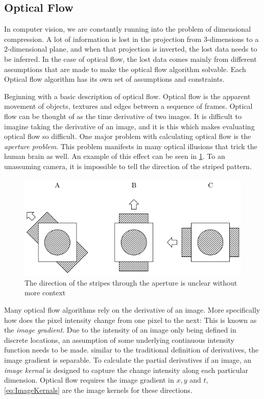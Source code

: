 \documentclass{UoNMCHA}
\numberwithin{equation}{section}
\begin{document}
\newpage
\subsection{Optical Flow}
In computer vision, we are constantly running into the problem of dimensional compression. A lot of information is lost in the projection from 3-dimensions to a 2-dimensional plane, and when that projection is inverted, the lost data needs to be inferred. In the case of optical flow, the lost data comes mainly from different assumptions that are made to make the optical flow algorithm solvable. Each Optical flow algorithm has its own set of assumptions and constraints.

Beginning with a basic description of optical flow. Optical flow is the apparent movement of objects, textures and edges between a sequence of frames. Optical flow can be thought of as the time derivative of two images. It is difficult to imagine taking the derivative of an image, and it is this which makes evaluating optical flow so difficult. One major problem with calculating optical flow is the \textit{aperture problem}. This problem manifests in many optical illusions that trick the human brain as well. An example of this effect can be seen in \cref{fig:ApertureProblem}. To an unassuming camera, it is impossible to tell the direction of the striped pattern.

\begin{figure}[ht]
    \begin{center}
        \includegraphics[width=.6\linewidth]{Figures/ApertureProblem}
        \caption{The direction of the stripes through the aperture is unclear without more context}
        \label{fig:ApertureProblem}
    \end{center}
\end{figure}

Many optical flow algorithms rely on the derivative of an image. More specifically how does the pixel intensity change from one pixel to the next: This is known as the \textit{image gradient}. Due to the intensity of an image only being defined in discrete locations, an assumption of some underlying continuous intensity function needs to be made. similar to the traditional definition of derivatives, the image gradient is separable. To calculate the partial derivatives if an image, an \textit{image kernal} is designed to capture the change intensity along each particular dimension. Optical flow requires the image gradient in $x, y$ and $t$, \cref{eq:ImageKernals} are the image kernels for these directions.
\end{document}
